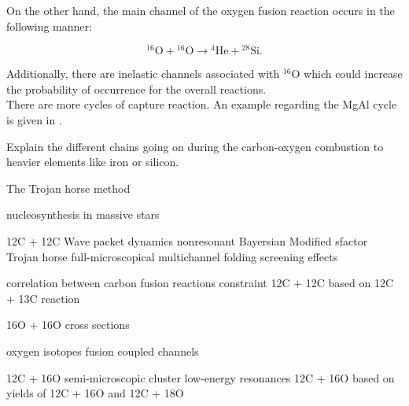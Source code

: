 \documentclass[openany]{book}
\begin{document}
On the other hand, the main channel of the oxygen fusion reaction occurs in the following manner:

\begin{equation} \label{eq:reaction_O12fusion_alpha28Si}
	\mathrm{{}^{16}O + {}^{16}O \rightarrow {}^{4}He + {}^{28}Si}. 
\end{equation}

Additionally, there are inelastic channels associated with $\mathrm{{}^{16}O}$ which could increase the probability of occurrence for the overall reactions.  \\



There are more cycles of capture reaction. An example regarding the MgAl cycle is given in \cite{lotay_doherty_janssens_seweryniak_albers_almaraz-calderon_carpenter_champagne_chiara_hoffman_et_2022}.

Explain the different chains going on during the carbon-oxygen combustion to heavier elements like iron or silicon.

The Trojan horse method\cite{spitaleri_mukhamedzhanov_blokhintsev_cognata_pizzone_tumino_2011}

nucleosynthesis in massive stars \cite{pignatari_hirschi_wiescher_gallino_bennett_beard_fryer_herwig_rockefeller_timmes_et_2012}

12C + 12C Wave packet dynamics\cite{diaz-torres_wiescher_2018}
nonresonant Bayersian \cite{li_fang_bucher_li_ru_tang_2020}
Modified sfactor \cite{luo_wen_lin_yang_jia_yang_huang_chang_zhang_yang_et_2022}
Trojan horse \cite{mukhamedzhanov_pang_kadyrov_2019}
\cite{mukhamedzanov_2022}
full-microscopical \cite{taniguchi_kimura_2021}
multichannel folding \cite{assuncao_descouvemont_2016}
screening effects \cite{koyuncu_soylu_2018}

correlation between carbon fusion reactions \cite{notani_esbensen_fang_bucher_davies_jiang_lamm_lin_ma_martin_et_2012}
constraint 12C + 12C based on 12C + 13C reaction \cite{zhang_wang_tudor_bucher_burducea_chen_chen_chesneanu_chilug_gasques_et_2020}

16O + 16O cross sections \cite{duarte_gasques_oliveira_zagatto_chamon_medina_added_seale_alcantara-nunez_rossi_et_2015}
\cite{kuronen_keinonen_tikkanen_1987}

oxygen isotopes fusion \cite{thomas_chen_hinds_meredith_olson_1986}
coupled channels \cite{guimin_deji_xiaowu_1992}

12C + 16O semi-microscopic cluster \cite{ferreira_lubian_linares_ermamatov_yepez-martinez_hess_2019}
low-energy resonances \cite{torilov_maltsev_zherebchevsky_2021}
12C + 16O based on yields of 12C + 16O and 12C + 18O \cite{chan_bohn_vandenbosch_sielemann_cramer_bernhardt_bhang_chiang_1979}
\end{document}
